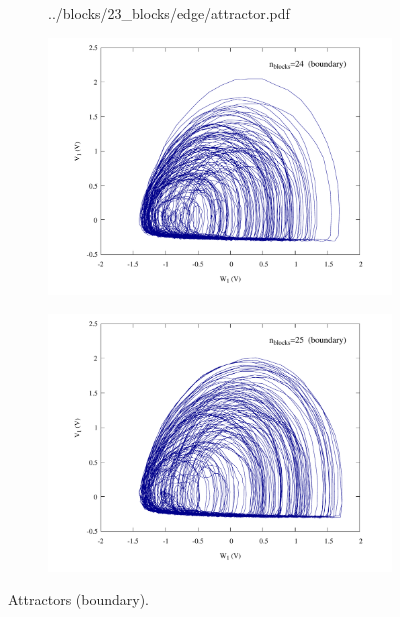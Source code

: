 \begin{figure}
\begin{minipage}{.47\textwidth}
\begin{subfigure}{\linewidth}
            {../blocks/23_blocks/edge/attractor.pdf}
        \end{subfigure}
    \end{minipage}
    \begin{minipage}{.47\textwidth}
        \begin{subfigure}{\linewidth}
            \centering
            \includegraphics[width=\linewidth]
            {../blocks/24_blocks/attractor.pdf}
        \end{subfigure}
    \end{minipage}
    \begin{minipage}{.47\textwidth}
        \begin{subfigure}{\linewidth}
            \centering
            \includegraphics[width=\linewidth]
            {../blocks/25_blocks/edge/attractor.pdf}
        \end{subfigure}
    \end{minipage}
    \caption{Attractors (boundary).}
    \label{fig:attractors 18-25}
\end{figure}

